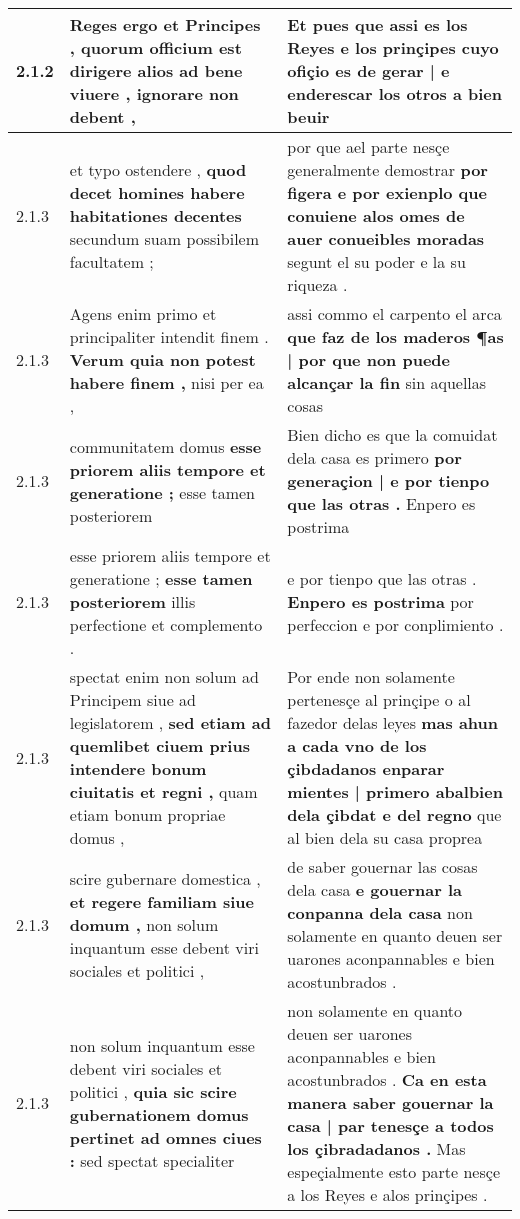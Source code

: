 \begin{tabular}{|p{1cm}|p{6.5cm}|p{6.5cm}|}
2.1.2 & Reges ergo et Principes , \textbf{ quorum officium est dirigere alios } ad bene viuere , ignorare non debent , & Et pues que assi es los Reyes e los prinçipes \textbf{ cuyo ofiçio es de gerar | e enderescar los otros } a bien beuir \\\hline
2.1.3 & et typo ostendere , \textbf{ quod decet homines habere habitationes decentes } secundum suam possibilem facultatem ; & por que ael parte nesçe generalmente demostrar \textbf{ por figera e por exienplo que conuiene alos omes de auer conueibles moradas } segunt el su poder e la su riqueza . \\\hline
2.1.3 & Agens enim primo et principaliter intendit finem . \textbf{ Verum quia non potest habere finem , } nisi per ea , & assi commo el carpento el arca \textbf{ que faz de los maderos ¶as | por que non puede alcançar la fin } sin aquellas cosas \\\hline
2.1.3 & communitatem domus \textbf{ esse priorem aliis tempore et generatione ; } esse tamen posteriorem & Bien dicho es que la comuidat dela casa es primero \textbf{ por generaçion | e por tienpo que las otras . } Enpero es postrima \\\hline
2.1.3 & esse priorem aliis tempore et generatione ; \textbf{ esse tamen posteriorem } illis perfectione et complemento . & e por tienpo que las otras . \textbf{ Enpero es postrima } por perfeccion e por conplimiento . \\\hline
2.1.3 & spectat enim non solum ad Principem siue ad legislatorem , \textbf{ sed etiam ad quemlibet ciuem prius intendere bonum ciuitatis et regni , } quam etiam bonum propriae domus , & Por ende non solamente pertenesçe al prinçipe o al fazedor delas leyes \textbf{ mas ahun a cada vno de los çibdadanos enparar mientes | primero abalbien dela çibdat e del regno } que al bien dela su casa proprea \\\hline
2.1.3 & scire gubernare domestica , \textbf{ et regere familiam siue domum , } non solum inquantum esse debent viri sociales et politici , & de saber gouernar las cosas dela casa \textbf{ e gouernar la conpanna dela casa } non solamente en quanto deuen ser uarones aconpannables e bien acostunbrados . \\\hline
2.1.3 & non solum inquantum esse debent viri sociales et politici , \textbf{ quia sic scire gubernationem domus pertinet ad omnes ciues : } sed spectat specialiter & non solamente en quanto deuen ser uarones aconpannables e bien acostunbrados . \textbf{ Ca en esta manera saber gouernar la casa | par tenesçe a todos los çibradadanos . } Mas espeçialmente esto parte nesçe a los Reyes e alos prinçipes . \\\hline

\end{tabular}
